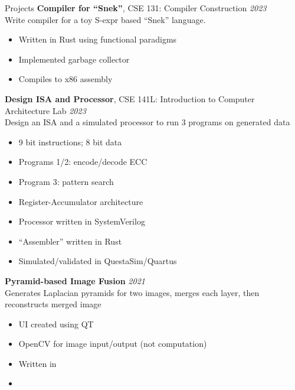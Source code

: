 \begin{rSection}{Projects}
		{\bf Compiler for ``Snek''}{, CSE 131: Compiler Construction} \hfill {\em 2023} \\
		Write compiler for a toy S-expr based ``Snek'' language.
		\begin{multicols}{2}
			\begin{itemize}
				\item Written in Rust using functional paradigms
				\item Implemented garbage collector
				\item Compiles to x86 assembly
			\end{itemize}
		\end{multicols}

		{\bf Design ISA and Processor}{, CSE 141L: Introduction to Computer Architecture Lab} \hfill {\em 2023} \\
		Design an ISA and a simulated processor to run 3 programs on generated data
		\begin{multicols}{2}
			\begin{itemize}
				\item 9 bit instructions; 8 bit data
				\item Programs 1/2: encode/decode ECC
				\item Program 3: pattern search
				\item Register-Accumulator architecture
				\item Processor written in SystemVerilog
				\item ``Assembler'' written in Rust
				\item Simulated/validated in QuestaSim/Quartus
			\end{itemize}
		\end{multicols}

		{\bf Pyramid-based Image Fusion}{} \hfill {\em 2021} \\
		Generates Laplacian pyramids for two images, merges each layer, then reconstructs merged image
		\begin{multicols}{2}
			\begin{itemize}
				\item UI created using QT
				\item OpenCV for image input/output (not computation)
				\item Written in \CC
				\item[\vspace{\fill}] %
			\end{itemize}
		\end{multicols}


\end{rSection}
